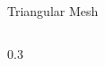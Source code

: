 \documentclass{beamer}
\begin{document}
\begin{frame}{Triangular Mesh}
\begin{columns}
\begin{column}{0.3\pagewidth}
\begin{figure}

\end{figure}
\end{column}
\end{columns}
\end{frame}
\end{document}
